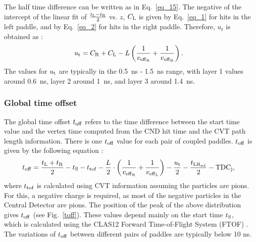 The half time difference can be written as in Eq.~\ref{eq_15}. 
The negative of the intercept of the linear fit of $\frac{t_{\rm{L}}-t_{\rm{R}}}{2}$ vs. $z$, $C_{\rm{L}}$ is given by Eq.~\ref{eq_1} for hits in the left paddle, and by Eq.~\ref{eq_2} for hits in the right paddle. 
Therefore, $u_t$ is obtained as :
\begin{equation}
u_{\rm{t}}=C_{\rm{R}}+C_{\rm{L}}-L \left(\frac{1}{v_{\rm{eff}_{\rm{R}}}}+\frac{1}{v{_{\rm{eff}_{\rm{R}}}}}\right).
\end{equation}
The values for $u_{\rm{t}}$ are typically in the 0.5~ns - 1.5~ns range, with layer 1 values around 0.6~ns, layer 2 around 1~ns, and layer 3 around 1.4~ns.

\subsubsection{Global time offset}

The global time offset $t_{\rm{off}}$ refers to the time difference between the start time value and the vertex time computed from the CND hit time and the CVT path length information. There is one $t_{\rm off}$ value for each pair of coupled paddles.
$t_{\rm{off}}$ is given by the following equation :
\begin{equation}
t_{\rm{off}} = \frac{t_{\rm{L}}+t_{\rm{R}}}{2} - t_{\rm{S}} - t_{\rm{tof}}
                    - \frac{L}{2} \cdot \left(\frac{1}{v_{\rm{eff}_{\rm{R}}}} + \frac{1}{v_{\rm{eff}_L}}\right) - \frac{u_{\rm{t}}}{2} - \frac{t_{\rm{LR}_{\rm{ad}}}}{2}-{\rm{TDC}}_{\rm{j}},
\end{equation}
where $t_{\rm{tof}}$ is calculated using CVT information assuming the particles are pions. For this, a negative charge is required, as most of the negative particles in the Central Detector are pions. The position of the peak of the above distribution gives $t_{\rm{off}}$ (see Fig.~\ref{toff}). These values depend mainly on the start time $t_{\rm{S}}$, which is calculated using the CLAS12 Forward Time-of-Flight System (FTOF) \cite{ftof-nim}. The variations of $t_{\rm{off}}$ between different pairs of paddles are typically below 10 ns.

